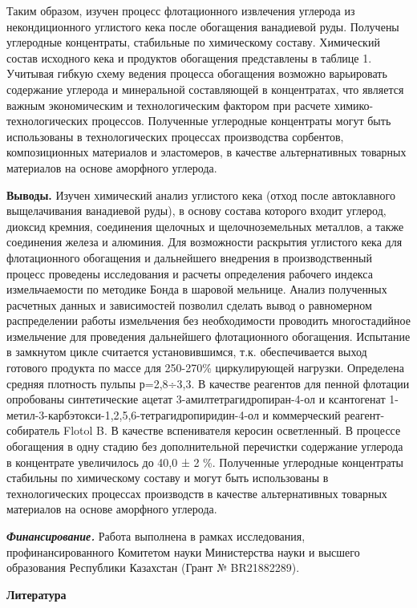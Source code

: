 Таким образом, изучен процесс флотационного извлечения углерода из
некондиционного углистого кека после обогащения ванадиевой руды.
Получены углеродные концентраты, стабильные по химическому составу.
Химический состав исходного кека и продуктов обогащения представлены в
таблице 1. Учитывая гибкую схему ведения процесса обогащения возможно
варьировать содержание углерода и минеральной составляющей в
концентратах, что является важным экономическим и технологическим
фактором при расчете химико-технологических процессов. Полученные
углеродные концентраты могут быть использованы в технологических
процессах производства сорбентов, композиционных материалов и
эластомеров, в качестве альтернативных товарных материалов на основе
аморфного углерода.

\textbf{Выводы.} Изучен химический анализ углистого кека (отход после
автоклавного выщелачивания ванадиевой руды), в основу состава которого
входит углерод, диоксид кремния, соединения щелочных и щелочноземельных
металлов, а также соединения железа и алюминия. Для возможности
раскрытия углистого кека для флотационного обогащения и дальнейшего
внедрения в производственный процесс проведены исследования и расчеты
определения рабочего индекса измельчаемости по методике Бонда в шаровой
мельнице. Анализ полученных расчетных данных и зависимостей позволил
сделать вывод о равномерном распределении работы измельчения без
необходимости проводить многостадийное измельчение для проведения
дальнейшего флотационного обогащения. Испытание в замкнутом цикле
считается установившимся, т.к. обеспечивается выход готового продукта по
массе для 250-270\% циркулирующей нагрузки. Определена средняя плотность
пульпы р=2,8÷3,3. В качестве реагентов для пенной флотации опробованы
синтетические ацетат 3-амилтетрагидропиран-4-ол и ксантогенат
1-метил-3-карбэтокси-1,2,5,6-тетрагидропиридин-4-ол и коммерческий
реагент-собиратель Flotol B. В качестве вспенивателя керосин
осветленный. В процессе обогащения в одну стадию без дополнительной
перечистки содержание углерода в концентрате увеличилось до 40,0 ± 2 \%.
Полученные углеродные концентраты стабильны по химическому составу и
могут быть использованы в технологических процессах производств в
качестве альтернативных товарных материалов на основе аморфного
углерода.

\emph{\textbf{Финансирование.}} Работа выполнена в рамках исследования,
профинансированного Комитетом науки Министерства науки и высшего
образования Республики Казахстан (Грант № BR21882289).

\textbf{Литература}

